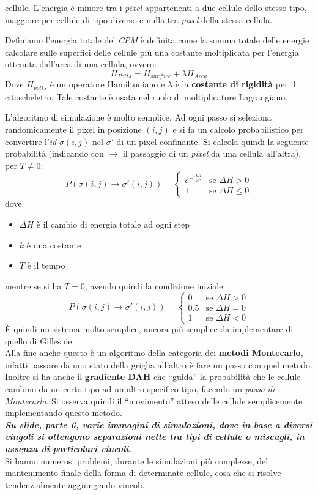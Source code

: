 \documentclass[a4paper,12pt, oneside]{book}
\begin{document}
cellule. L'energia è minore tra i \textit{pixel} appartenenti a due cellule
dello stesso tipo, maggiore per cellule di tipo diverso e nulla tra
\textit{pixel} della stessa cellula.
\begin{definizione}
  Definiamo l'energia totale del \textit{CPM} è definita come la somma totale
  delle energie calcolare sulle superfici delle cellule più una costante
  moltiplicata per l'energia ottenuta dall'area di una cellula, ovvero:
  \[H_{Potts}=H_{surface}+\lambda H_{Area}\]
  Dove $H_{potts}$ è un operatore Hamiltoniano e $\lambda$ è la \textbf{costante
  di rigidità} per il citoscheletro. Tale costante è usata nel ruolo di
moltiplicatore Lagrangiano. 
\end{definizione}
L'algoritmo di simulazione è molto semplice. Ad ogni passo si seleziona
randomicamente il pixel in posizione $(i,j)$ e si fa un calcolo probabilistico
per convertire l'\textit{id} $\sigma(i,j)$ nel $\sigma'$ di un pixel
confinante. Si calcola quindi la seguente probabilità (indicando con $\to$ il
passaggio di un \textit{pixel} da una cellula all'altra), per $T\neq 0$:
\[P(\sigma(i,j)\to\sigma'(i,j))=
  \begin{cases}
    e^{-\frac{\Delta H}{kT}}&\mbox{se }\Delta H>0\\
    1&\mbox{se }\Delta H\leq 0
  \end{cases}
\]
dove:
\begin{itemize}
  \item $\Delta H$ è il cambio di energia totale ad ogni step
  \item $k$ è una costante
  \item $T$ è il tempo
\end{itemize}
mentre se si ha $T=0$, avendo quindi la condizione iniziale:
\[P(\sigma(i,j)\to\sigma'(i,j))=
  \begin{cases}
    0&\mbox{se }\Delta H> 0\\
    0.5&\mbox{se }\Delta H= 0\\
    1&\mbox{se }\Delta H< 0
  \end{cases}
\]
È quindi un sistema molto semplice, ancora più semplice da implementare di
quello di Gillespie.\\
Alla fine anche questo è un algoritmo della categoria dei \textbf{metodi
  Montecarlo}, infatti passare da uno stato della griglia all'altro è fare un
passo con quel metodo.\\
Inoltre si ha anche il \textbf{gradiente DAH} che ``guida'' la probabilità che
le cellule cambino da un certo tipo ad un altro specifico tipo, facendo un
\textit{passo di Montecarlo}. Si osserva quindi il ``movimento'' atteso delle
cellule semplicemente implementando questo metodo.\\
\textbf{\textit{Su slide, parte 6, varie immagini di simulazioni, dove in base a
  diversi vingoli si ottengono separazioni nette tra tipi di cellule o miscugli,
  in assenza di particolari vincoli}.}\\
Si hanno numerosi problemi, durante le simulazioni più complesse, del
mantenimento finale della forma di determinate cellule, cosa che si risolve
tendenzialmente aggiungendo vincoli.
\end{document}
